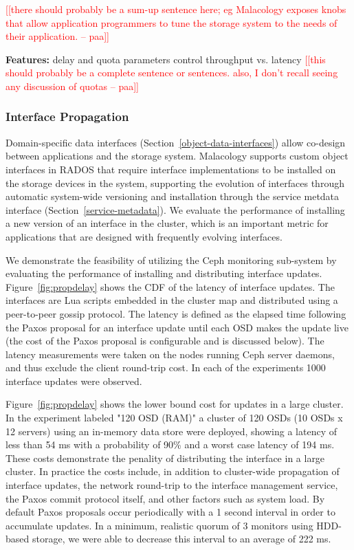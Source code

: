 \documentclass[preprint]{sigplanconf-eurosys}
\newcommand{\paa}[1]{{\textcolor{red}{[[#1 -- paa]]}}}
\begin{document}
\paa{there should probably be a sum-up sentence here; eg Malacology exposes knobs that
allow application programmers to tune the storage system to the needs of their application.}

\noindent\textbf{Features:} delay and quota parameters control throughput vs.
latency
\paa{this should probably be a complete sentence or sentences.  also, I don't recall
seeing any discussion of quotas}

\subsubsection{Interface Propagation}

Domain-specific data interfaces (Section~\ref{object-data-interfaces}) allow
co-design between applications and the storage system. Malacology supports
custom object interfaces in RADOS that require interface implementations to
be installed on the storage devices in the system, supporting the evolution of
interfaces through automatic system-wide versioning and installation through
the service metdata interface (Section~\ref{service-metadata}). We evaluate
the performance of installing a new version of an interface in the cluster,
which is an important metric for applications that are designed with
frequently evolving interfaces.

We demonstrate the feasibility of utilizing the Ceph monitoring sub-system by
evaluating the performance of installing and distributing interface updates.
Figure~\ref{fig:propdelay} shows the CDF of the latency of interface updates.
The interfaces are Lua scripts embedded in the cluster map and distributed
using a peer-to-peer gossip protocol.  The latency is defined as the elapsed
time following the Paxos proposal for an interface update until each OSD makes
the update live (the cost of the Paxos proposal is configurable and is
discussed below). The latency measurements were taken on the nodes running
Ceph server daemons, and thus exclude the client round-trip cost. In each of
the experiments 1000 interface updates were observed.

Figure~\ref{fig:propdelay} shows the lower bound cost for updates in a large
cluster. In the experiment labeled "120 OSD (RAM)" a cluster of 120 OSDs (10
OSDs x 12 servers) using an in-memory data store were deployed, showing a
latency of less than 54 ms with a probability of 90\% and a worst case latency
of 194 ms. These costs demonstrate the penality of distributing the interface
in a large cluster. In practice the costs include, in addition to cluster-wide
propagation of interface updates, the network round-trip to the
interface management service, the Paxos commit protocol itself, and other factors
such as system load. By default Paxos proposals occur periodically with a 1
second interval in order to accumulate updates. In a minimum, realistic quorum
of 3 monitors using HDD-based storage, we were able to decrease this interval
to an average of 222 ms.
\end{document}
